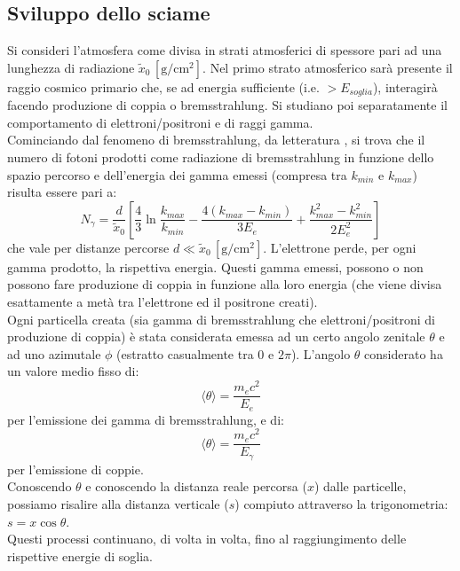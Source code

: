 \documentclass[10pt,a4paper,usenatbib]{article}
\newcommand*{\unit}[1]{\ensuremath{\mathrm{\,#1}}}                              %
\begin{document}
\subsection{Sviluppo dello sciame}
Si consideri l'atmosfera come divisa in strati atmosferici di spessore pari ad una lunghezza di radiazione $\tilde{x}_0 \unit{[g/cm^2]}$. Nel primo strato atmosferico sarà presente il raggio cosmico primario che, se ad energia sufficiente (i.e. $> E_{soglia}$), interagirà facendo produzione di coppia o bremsstrahlung. Si studiano poi separatamente il comportamento di elettroni/positroni e di raggi gamma. 
\\Cominciando dal fenomeno di bremsstrahlung, da letteratura \citep{PassParticMatterPDG}, si trova che il numero di fotoni prodotti come radiazione di bremsstrahlung in funzione dello spazio percorso e dell'energia dei gamma emessi (compresa tra $k_{min}$ e $k_{max}$) risulta essere pari a: 
\begin{equation}
N_\gamma = \frac{d}{\tilde{x}_0}\left[\frac{4}{3}\ln{\frac{k_{max}}{k_{min}}}-\frac{4(k_{max} - k_{min})}{3E_e}+\frac{k_{max}^2 - k_{min}^2}{2E_e^2}\right]
\label{eq:Ngamma}
\end{equation}
che vale per distanze percorse $d \ll \tilde{x}_0 \unit{[g/cm^2]}$. L'elettrone perde, per ogni gamma prodotto, la rispettiva energia. Questi gamma emessi, possono o non possono fare produzione di coppia in funzione alla loro energia (che viene divisa esattamente a metà tra l'elettrone ed il positrone creati). 
\\Ogni particella creata (sia gamma di bremsstrahlung che elettroni/positroni di produzione di coppia) è stata considerata emessa ad un certo angolo zenitale $\theta$ e ad uno azimutale $\phi$ (estratto casualmente tra 0 e $2\pi$). L'angolo $\theta$ considerato ha un valore medio fisso di: 
\begin{equation}
\langle\theta\rangle = \frac{m_e c^2}{E_e}
\end{equation}
per l'emissione dei gamma di bremsstrahlung, e di: 
\begin{equation}
\langle\theta\rangle = \frac{m_e c^2}{E_\gamma}
\end{equation}
per l'emissione di coppie. 
\\Conoscendo $\theta$ e conoscendo la distanza reale percorsa ($x$) dalle particelle, possiamo risalire alla distanza verticale ($s$) compiuto attraverso la trigonometria: $s = x\cos{\theta}$. 
\\Questi processi continuano, di volta in volta, fino al raggiungimento delle rispettive energie di soglia. 
\end{document}
